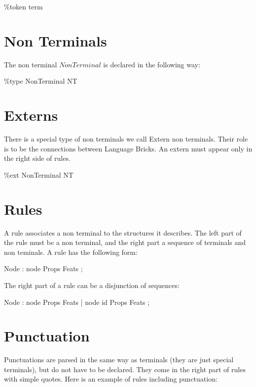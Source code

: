 \documentclass[11pt,fleqn]{book} %
\begin{document}
\begin{theorem}
$\%$token term    
\end{theorem}

\section{Non Terminals}

The non terminal $NonTerminal$ is declared in the following way:

\begin{theorem}
$\%$type NonTerminal NT    
\end{theorem}

 

\section{Externs}

There is a special type of non terminals we call Extern non terminals. Their role is to be the connections between Language Bricks. An extern must appear only in the right side of rules.

\begin{theorem}
$\%$ext NonTerminal NT
\end{theorem}

\section{Rules}

A rule associates a non terminal to the structures it describes. The left part of the rule must be a non terminal, and the right part a sequence of terminals and non teminals.
A rule has the following form:

\begin{theorem}
Node : node Props Feats  ;  
\end{theorem}

The right part of a rule can be a disjunction of sequences:

\begin{theorem}
Node : node Props Feats | node id Props Feats  ;  
\end{theorem}

\section{Punctuation}

Punctuations are parsed in the same way as terminals (they are just special terminals), but do not have to be declared. They come in the right part of rules with simple quotes. Here is an example of rules including punctuation:
\end{document}
